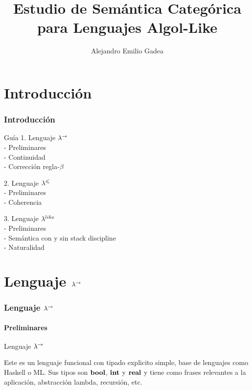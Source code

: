 \documentclass{beamer}
\begin{document}
\beamertemplatenavigationsymbolsempty
\title{Estudio de Semántica Categórica para Lenguajes Algol-Like}
\author{{Alejandro Emilio Gadea}\\
\vspace*{0.5cm}}
\date{}
\frame{\titlepage}

\section{Introducci\'on}

\begin{frame}
\frametitle{Introducci\'on}
\begin{block}{Gu\'ia}
1. Lenguaje $\lambda^{\rightarrow}$\\
\quad \quad - Preliminares \\
\quad \quad - Continuidad \\
\quad \quad - Corrección regla-$\beta$\\

\pause

2. Lenguaje $\lambda^{\leqslant}$\\
\quad \quad - Preliminares \\
\quad \quad - Coherencia \\

\pause

3. Lenguaje $\lambda^{like}$\\
\quad \quad - Preliminares \\
\quad \quad - Semántica con y sin stack discipline \\
\quad \quad - Naturalidad 

\end{block}
\end{frame}

\section{Lenguaje $\lambda^{\rightarrow}$}

\begin{frame}
\frametitle{Lenguaje $\lambda^{\rightarrow}$}
\framesubtitle{Preliminares}

\begin{block}{Lenguaje $\lambda^{\rightarrow}$}

Este es un lenguaje funcional con tipado explicito simple, base
de lenguajes como Haskell o ML. Sus tipos son $\textbf{bool}$, $\textbf{int}$ y $\textbf{real}$ 
y tiene como frases relevantes a la aplicación, abstracción lambda, recursión, etc.

\end{block}

\end{frame}
\end{document}
